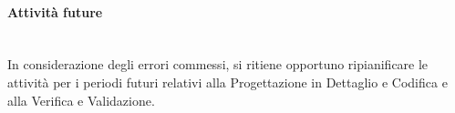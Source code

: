 \paragraph{Attività future}\mbox{}\\
In considerazione degli errori commessi, si ritiene opportuno ripianificare le attività per i periodi futuri relativi alla Progettazione in Dettaglio e Codifica e alla Verifica e Validazione. 
%
